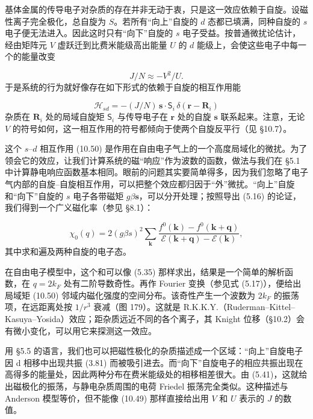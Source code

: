 基体金属的传导电子对杂质的存在并非无动于衷，只是这一效应依赖于自旋。设磁性离子完全极化，总自旋为 $S$。若所有“向上”自旋的 $d$ 态都已填满，同种自旋的 $s$ 电子便无法进入。因此这时只有“向下”自旋的 $s$ 电子受益。按普通微扰论估计，经由矩阵元 $V$ 虚跃迁到比费米能级高出能量 $U$ 的 $d$ 能级上，会使这些电子中每一个的能量改变

\begin{equation*}
J/N \approx -V^2/U. \tag{10.49}
\end{equation*}
于是系统的行为就好像存在如下形式的依赖于自旋的相互作用能

\begin{equation*}
\mathcal{H}_{sd} = -(J/N)\, \mathbf{s} \cdot \boldsymbol{\mathsf{S}}_i\, \delta(\mathbf{r} - \mathbf{R}_i) \tag{10.50}
\end{equation*}
杂质在 $\mathbf{R}_i$ 处的局域自旋矩 $\boldsymbol{\mathsf{S}}_i$ 与传导电子在 $\mathbf{r}$ 处的自旋 $\mathbf{s}$ 联系起来。注意，无论 $V$ 的符号如何，这一相互作用的符号都倾向于使两个自旋反平行（见 §10.7）。

这个 $s$–$d$ 相互作用 (10.50) 是作用在自由电子气上的一个高度局域化的微扰。为了领会它的效应，让我们计算系统的磁“响应”作为波数的函数，做法与我们在 §5.1 中计算静电响应函数基本相同。眼前的问题其实要简单得多，因为我们忽略了电子气内部的自旋–自旋相互作用，可以把整个效应都归因于“外”微扰。“向上”自旋和“向下”自旋的 $s$ 电子各带磁矩 $g\beta\mathbf{s}$，可以分开处理；按照导出 (5.16) 的论证，我们得到一个广义磁化率（参见 §8.1）：

\begin{equation*}
\chi_0(q) = 2(g\beta s)^2 \sum_{\mathbf{k}} \frac{f^0(\mathbf{k}) - f^0(\mathbf{k}+\mathbf{q})}{\mathcal{E}(\mathbf{k}+\mathbf{q}) - \mathcal{E}(\mathbf{k})}, \tag{10.51}
\end{equation*}
其中求和遍及两种自旋的电子态。

在自由电子模型中，这个和可以像 (5.35) 那样求出，结果是一个简单的解析函数，在 $q = 2k_F$ 处有二阶导数奇性。再作 Fourier 变换（参见式 (5.17)），便给出局域矩 (10.50) 邻域内磁化强度的空间分布。该奇性产生一个波数为 $2k_F$ 的振荡项，在远距离处按 $1/r^3$ 衰减（图 179）。这就是 R.K.K.Y.（Ruderman--Kittel--Kasuya--Yosida）效应；距杂质远近不同的各个离子，其 Knight 位移（§10.2）会有微小变化，可以用它来探测这一效应。

用 §5.5 的语言，我们也可以把磁性极化的杂质描述成一个区域：“向上”自旋电子因 d 相移中出现共振 (3.81) 而被吸引进去。而“向下”自旋电子的相应共振出现在高得多的能量处，因此两种分布在费米能级处的相移相差很大。由 (5.41)，这就给出磁极化的振荡，与静电杂质周围的电荷 Friedel 振荡完全类似。这种描述与 Anderson 模型等价，但不能像 (10.49) 那样直接给出用 $V$ 和 $U$ 表示的 $J$ 的数值。

